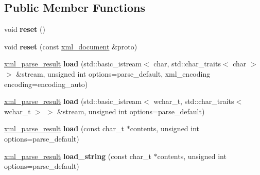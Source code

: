 \subsection*{Public Member Functions}
\begin{DoxyCompactItemize}
\item 
\hypertarget{classpugi_1_1xml__document_acf2b9daf1d12e12048796118b7a7685d}{void {\bfseries reset} ()}\label{classpugi_1_1xml__document_acf2b9daf1d12e12048796118b7a7685d}

\item 
\hypertarget{classpugi_1_1xml__document_a4230de3de88f4fe481c4c3d5312aa5cf}{void {\bfseries reset} (const \hyperlink{classpugi_1_1xml__document}{xml\+\_\+document} \&proto)}\label{classpugi_1_1xml__document_a4230de3de88f4fe481c4c3d5312aa5cf}

\item 
\hypertarget{classpugi_1_1xml__document_abb7db3882f94ac35b870510789a87778}{\hyperlink{structpugi_1_1xml__parse__result}{xml\+\_\+parse\+\_\+result} {\bfseries load} (std\+::basic\+\_\+istream$<$ char, std\+::char\+\_\+traits$<$ char $>$ $>$ \&stream, unsigned int options=parse\+\_\+default, xml\+\_\+encoding encoding=encoding\+\_\+auto)}\label{classpugi_1_1xml__document_abb7db3882f94ac35b870510789a87778}

\item 
\hypertarget{classpugi_1_1xml__document_a36131b6f1a80a1248666f4e7fe352685}{\hyperlink{structpugi_1_1xml__parse__result}{xml\+\_\+parse\+\_\+result} {\bfseries load} (std\+::basic\+\_\+istream$<$ wchar\+\_\+t, std\+::char\+\_\+traits$<$ wchar\+\_\+t $>$ $>$ \&stream, unsigned int options=parse\+\_\+default)}\label{classpugi_1_1xml__document_a36131b6f1a80a1248666f4e7fe352685}

\item 
\hypertarget{classpugi_1_1xml__document_ae17a77772fa21a40f3d91d9c79e60d0b}{\hyperlink{structpugi_1_1xml__parse__result}{xml\+\_\+parse\+\_\+result} {\bfseries load} (const char\+\_\+t $\ast$contents, unsigned int options=parse\+\_\+default)}\label{classpugi_1_1xml__document_ae17a77772fa21a40f3d91d9c79e60d0b}

\item 
\hypertarget{classpugi_1_1xml__document_a706a276ee3d5010f2bb8c7eacb75a891}{\hyperlink{structpugi_1_1xml__parse__result}{xml\+\_\+parse\+\_\+result} {\bfseries load\+\_\+string} (const char\+\_\+t $\ast$contents, unsigned int options=parse\+\_\+default)}\label{classpugi_1_1xml__document_a706a276ee3d5010f2bb8c7eacb75a891}


\end{DoxyCompactItemize}
